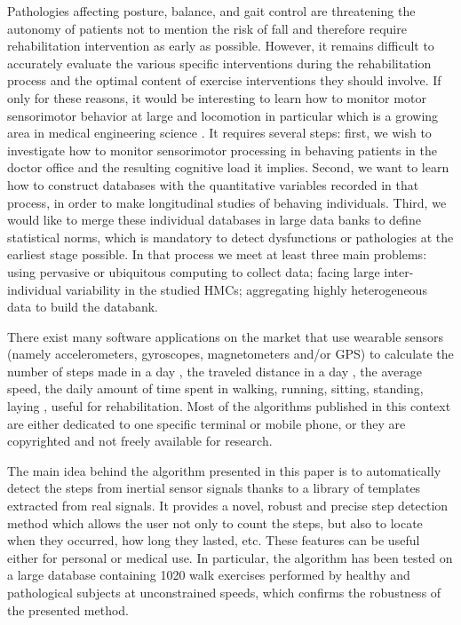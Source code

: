 \documentclass[../thesis.tex]{subfiles}
\begin{document}
Pathologies affecting posture, balance, and gait control are threatening the autonomy of patients not to mention the risk of fall and therefore require rehabilitation intervention as early as possible. However, it remains difficult to accurately evaluate  the various specific interventions during the rehabilitation process and the optimal content of exercise interventions they should involve.  If only for these reasons, it would be interesting to learn how to monitor motor sensorimotor behavior at large and locomotion in particular which is a growing area in medical engineering science \citep{mariani,marschollek2008performance,willemsen1990automatic,dijkstra2008detection,han2006gait,Ayachi2016,williamson2000gait}. It requires several steps: first, we wish to investigate how to monitor sensorimotor processing in behaving patients in the doctor office and the resulting cognitive load it implies. Second, we want to learn how to construct databases with the quantitative variables recorded in that 
process, in order to make longitudinal studies of behaving individuals. Third, we would like to merge these individual databases in large data banks to define statistical norms, which is mandatory to detect dysfunctions or pathologies at the earliest stage possible. In that process we meet at least three main problems: using pervasive or ubiquitous computing to collect data; facing large inter-individual variability in the studied HMCs; aggregating highly heterogeneous data to build the databank.


There exist many software applications on the market that use wearable sensors (namely accelerometers, gyroscopes, magnetometers and/or GPS) to calculate the number of steps made in a day \citep{tran2012high,naqvi2012step}, the traveled distance in a day \citep{renaudin2012step,kim2004step}, the average speed, the daily amount of time spent in walking, running, sitting, standing, laying  \citep{oner2012towards,brajdic2013walk}, useful for rehabilitation. Most of the algorithms published in this context are either dedicated to one specific terminal or mobile phone, or they are copyrighted and not freely available for research.

The main idea behind the algorithm presented in this paper is to automatically detect the steps from inertial sensor signals thanks to a library of templates extracted from real signals. It provides a novel, robust and precise step detection method which allows the user not only to count the steps, but also to locate when they occurred, how long they lasted, etc. These features can be useful either for personal or medical use. In particular, the algorithm has been tested on a large database containing 1020 walk exercises performed by healthy and pathological subjects at unconstrained speeds, which confirms the robustness of the presented method.
\end{document}
